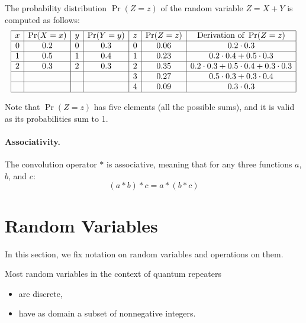 \documentclass{masterthesis}
\begin{document}
The probability distribution $\Pr(Z = z)$ of the random variable $Z = X + Y$ is computed as follows:
\begin{equation*}\label{eq:convolution_example}
    \begin{array}{|c|c|c|c|c|c|c|}
        \hline
        x & \Pr(X = x) & y & \Pr(Y = y) & z & \Pr(Z = z) & \text{Derivation of }\Pr(Z = z)\\
        \hline
        0 & 0.2 & 0 & 0.3 & 0 & 0.06 & 0.2 \cdot 0.3 \\
        \hline
        1 & 0.5 & 1 & 0.4 & 1 & 0.23 & 0.2 \cdot 0.4 + 0.5 \cdot 0.3 \\
        \hline
        2 & 0.3 & 2 & 0.3 & 2 & 0.35 & 0.2 \cdot 0.3 + 0.5 \cdot 0.4 + 0.3 \cdot 0.3 \\
        \hline
         &  &  &  & 3 & 0.27 & 0.5 \cdot 0.3 + 0.3 \cdot 0.4 \\
        \hline
         &  &  &  & 4 & 0.09 & 0.3 \cdot 0.3 \\
        \hline
    \end{array}
\end{equation*}

Note that $\Pr(Z = z)$ has five elements (all the possible sums), and it is valid as its probabilities sum to 1.

\paragraph*{Associativity.}
\begin{samepage}
    The convolution operator \( * \) is associative, meaning that for any three functions \(a\), \(b\), and \(c\):
    \begin{equation}\label{eq:convolution_associativity} 
        (a * b) * c = a * (b * c)
    \end{equation}        
\end{samepage}

\section{Random Variables}

In this section, we fix notation on random variables and operations on them. 

Most random variables in the context of quantum repeaters
\begin{itemize}
    \item are discrete,
    \item have as domain a subset of nonnegative integers.
\end{itemize}
\end{document}
